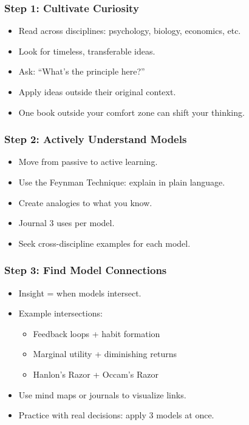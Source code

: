 \begin{frame}[fragile]\frametitle{Step 1: Cultivate Curiosity}
  \begin{itemize}
    \item Read across disciplines: psychology, biology, economics, etc.
    \item Look for timeless, transferable ideas.
    \item Ask: ``What's the principle here?''
    \item Apply ideas outside their original context.
    \item One book outside your comfort zone can shift your thinking.
  \end{itemize}
\end{frame}

\begin{frame}[fragile]\frametitle{Step 2: Actively Understand Models}
  \begin{itemize}
    \item Move from passive to active learning.
    \item Use the Feynman Technique: explain in plain language.
    \item Create analogies to what you know.
    \item Journal 3 uses per model.
    \item Seek cross-discipline examples for each model.
  \end{itemize}
\end{frame}

\begin{frame}[fragile]\frametitle{Step 3: Find Model Connections}
  \begin{itemize}
    \item Insight = when models intersect.
    \item Example intersections:
      \begin{itemize}
        \item Feedback loops + habit formation
        \item Marginal utility + diminishing returns
        \item Hanlon's Razor + Occam's Razor
      \end{itemize}
    \item Use mind maps or journals to visualize links.
    \item Practice with real decisions: apply 3 models at once.
  \end{itemize}
\end{frame}


